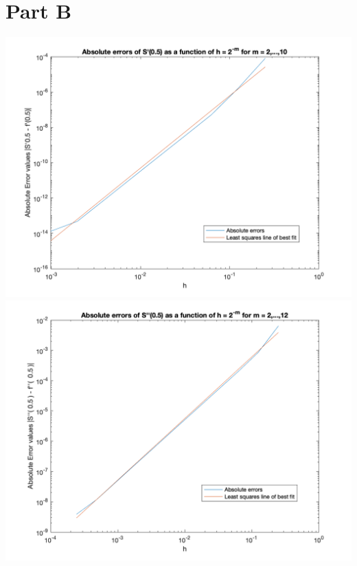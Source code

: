 \documentclass[11pt, oneside]{article}   	%
\begin{document}
\section*{Part B}
\begin{centering}
\includegraphics [scale=.25] {PartB1.png}
\includegraphics [scale=.25] {PartB2.png}
\end{centering}
\end{document}
